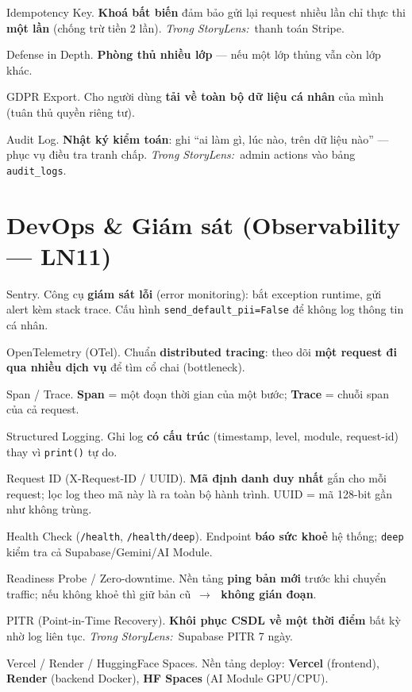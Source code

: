 \documentclass[11pt]{article}
\newcommand{\arr}{\,\ensuremath{\rightarrow}\,}
\newcommand{\code}[1]{\texttt{\small #1}}
\newcommand{\insl}{\textit{\textcolor{steel}{Trong StoryLens:}}\ }
\begin{document}
\begin{terms}
\item[Idempotency Key.] \textbf{Khoá bất biến} đảm bảo gửi lại request nhiều lần chỉ thực thi \textbf{một lần} (chống trừ tiền 2 lần). \insl thanh toán Stripe.
\item[Defense in Depth.] \textbf{Phòng thủ nhiều lớp} --- nếu một lớp thủng vẫn còn lớp khác.
\item[GDPR Export.] Cho người dùng \textbf{tải về toàn bộ dữ liệu cá nhân} của mình (tuân thủ quyền riêng tư).
\item[Audit Log.] \textbf{Nhật ký kiểm toán}: ghi ``ai làm gì, lúc nào, trên dữ liệu nào'' --- phục vụ điều tra tranh chấp. \insl admin actions vào bảng \code{audit\_logs}.
\end{terms}

\section{DevOps \& Giám sát (Observability --- LN11)}
\begin{terms}
\item[Sentry.] Công cụ \textbf{giám sát lỗi} (error monitoring): bắt exception runtime, gửi alert kèm stack trace. Cấu hình \code{send\_default\_pii=False} để không log thông tin cá nhân.
\item[OpenTelemetry (OTel).] Chuẩn \textbf{distributed tracing}: theo dõi \textbf{một request đi qua nhiều dịch vụ} để tìm cổ chai (bottleneck).
\item[Span / Trace.] \textbf{Span} = một đoạn thời gian của một bước; \textbf{Trace} = chuỗi span của cả request.
\item[Structured Logging.] Ghi log \textbf{có cấu trúc} (timestamp, level, module, request-id) thay vì \code{print()} tự do.
\item[Request ID (X-Request-ID / UUID).] \textbf{Mã định danh duy nhất} gắn cho mỗi request; lọc log theo mã này là ra toàn bộ hành trình. UUID = mã 128-bit gần như không trùng.
\item[Health Check (\code{/health}, \code{/health/deep}).] Endpoint \textbf{báo sức khoẻ} hệ thống; \code{deep} kiểm tra cả Supabase/Gemini/AI Module.
\item[Readiness Probe / Zero-downtime.] Nền tảng \textbf{ping bản mới} trước khi chuyển traffic; nếu không khoẻ thì giữ bản cũ \arr\ \textbf{không gián đoạn}.
\item[PITR (Point-in-Time Recovery).] \textbf{Khôi phục CSDL về một thời điểm} bất kỳ nhờ log liên tục. \insl Supabase PITR 7 ngày.
\item[Vercel / Render / HuggingFace Spaces.] Nền tảng deploy: \textbf{Vercel} (frontend), \textbf{Render} (backend Docker), \textbf{HF Spaces} (AI Module GPU/CPU).
\end{terms}
\end{document}

